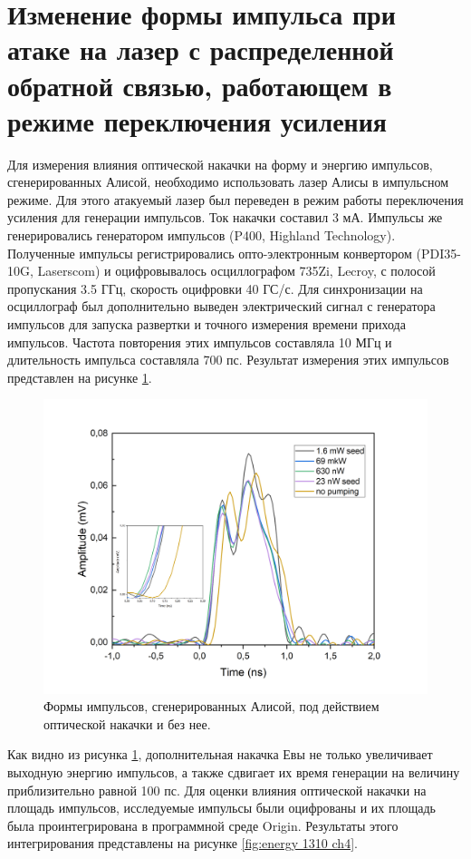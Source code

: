 \section{Изменение формы импульса при атаке на лазер с распределенной обратной связью, работающем в режиме переключения усиления}\label{sec:ch4/sect4} 
Для измерения влияния оптической накачки на форму и энергию импульсов, сгенерированных Алисой, необходимо использовать лазер Алисы в импульсном режиме. Для этого атакуемый лазер был переведен в режим работы переключения усиления для генерации импульсов. Ток накачки составил 3 мА. Импульсы же генерировались генератором импульсов (P400, Highland Technology). Полученные импульсы регистрировались опто-электронным конвертором (PDI35-10G, Laserscom) и оцифровывалось осциллографом 735Zi, Lecroy, с полосой пропускания 3.5 ГГц, скорость оцифровки 40 ГС/с. Для синхронизации на осциллограф был дополнительно выведен электрический сигнал с генератора импульсов для запуска развертки и точного измерения времени прихода импульсов. Частота повторения этих импульсов составляла 10 МГц и длительность импульса составляла 700 пс. Результат измерения этих импульсов представлен на рисунке \ref{fig:pulse shape ch4}.
\begin{figure}
    \centering
    \includegraphics[width=\linewidth]{images/Импульсы под действием 1310 для диссера.png}
    \caption{Формы импульсов, сгенерированных Алисой, под действием оптической накачки и без нее.}
    \label{fig:pulse shape ch4}
\end{figure}
Как видно из рисунка \ref{fig:pulse shape ch4}, дополнительная накачка Евы не только увеличивает выходную энергию импульсов, а также сдвигает их время генерации на величину приблизительно равной 100 пс. Для оценки влияния оптической накачки на площадь импульсов, исследуемые импульсы были оцифрованы и их площадь была проинтегрирована в программной среде Origin. Результаты этого интегрирования представлены на рисунке \ref{fig:energy 1310 ch4}.
